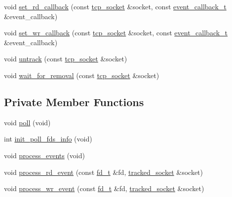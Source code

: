\begin{DoxyCompactItemize}
void \hyperlink{classtacopie_1_1io__service_a8094c1fec76c6821cc0c008fe524c89a}{set\+\_\+rd\+\_\+callback} (const \hyperlink{classtacopie_1_1tcp__socket}{tcp\+\_\+socket} \&socket, const \hyperlink{classtacopie_1_1io__service_abb66850c32d9c724f4418d77bd04bcfd}{event\+\_\+callback\+\_\+t} \&event\+\_\+callback)
\item 
void \hyperlink{classtacopie_1_1io__service_a7c4f56c7790c7ba52b09837a42aaffb1}{set\+\_\+wr\+\_\+callback} (const \hyperlink{classtacopie_1_1tcp__socket}{tcp\+\_\+socket} \&socket, const \hyperlink{classtacopie_1_1io__service_abb66850c32d9c724f4418d77bd04bcfd}{event\+\_\+callback\+\_\+t} \&event\+\_\+callback)
\item 
void \hyperlink{classtacopie_1_1io__service_a9a7672f0894a0fc1a3e6c593ca6df22c}{untrack} (const \hyperlink{classtacopie_1_1tcp__socket}{tcp\+\_\+socket} \&socket)
\item 
void \hyperlink{classtacopie_1_1io__service_aa57db619baeaa6db0aeb22e67b895cd7}{wait\+\_\+for\+\_\+removal} (const \hyperlink{classtacopie_1_1tcp__socket}{tcp\+\_\+socket} \&socket)
\end{DoxyCompactItemize}
\subsection*{Private Member Functions}
\begin{DoxyCompactItemize}
\item 
void \hyperlink{classtacopie_1_1io__service_a03813e0e91d70d367f9fb0ff0d86d3dd}{poll} (void)
\item 
int \hyperlink{classtacopie_1_1io__service_a7311358423dddd6a9d17c61b2c365ff8}{init\+\_\+poll\+\_\+fds\+\_\+info} (void)
\item 
void \hyperlink{classtacopie_1_1io__service_a90a2ab7b6bbaf10bbc0607ce371cc806}{process\+\_\+events} (void)
\item 
void \hyperlink{classtacopie_1_1io__service_a65c3ef9fa1473708b81b05029f6861f9}{process\+\_\+rd\+\_\+event} (const \hyperlink{namespacetacopie_acce7ad26b2d30156b1e6fa353f727026}{fd\+\_\+t} \&fd, \hyperlink{structtacopie_1_1io__service_1_1tracked__socket}{tracked\+\_\+socket} \&socket)
\item 
void \hyperlink{classtacopie_1_1io__service_a55e334cdf75187b9296c03447e32a63f}{process\+\_\+wr\+\_\+event} (const \hyperlink{namespacetacopie_acce7ad26b2d30156b1e6fa353f727026}{fd\+\_\+t} \&fd, \hyperlink{structtacopie_1_1io__service_1_1tracked__socket}{tracked\+\_\+socket} \&socket)
\end{DoxyCompactItemize}
